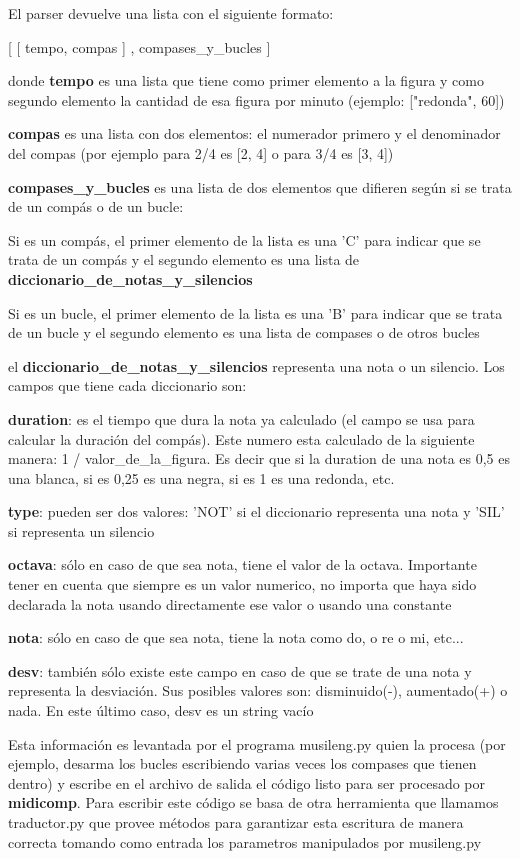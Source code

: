 El parser devuelve una lista con el siguiente formato:

[    [ tempo,  compas   ]   ,     compases\_y\_bucles  ]

donde \textbf{tempo} es una lista que tiene como primer elemento a la figura y como segundo elemento la cantidad de esa figura por minuto (ejemplo: ["redonda", 60])

\textbf{compas} es una lista con dos elementos: el numerador primero y el denominador del compas (por ejemplo para 2/4 es [2, 4] o para 3/4 es [3, 4])

\textbf{compases\_y\_bucles} es una lista de dos elementos que difieren según si se trata de un compás o de un bucle:

Si es un compás, el primer elemento de la lista es una 'C' para indicar que se trata de un compás y el segundo elemento es una lista de \textbf{diccionario\_de\_notas\_y\_silencios}

Si es un bucle, el primer elemento de la lista es una 'B' para indicar que se trata de un bucle y el segundo elemento es una lista de compases o de otros bucles

el \textbf{diccionario\_de\_notas\_y\_silencios} representa una nota o un silencio. Los campos que tiene cada diccionario son:

\textbf{duration}: es el tiempo que dura la nota ya calculado (el campo se usa para calcular la duración del compás). Este numero esta calculado de la siguiente manera: 1 / valor\_de\_la\_figura. Es decir que si la duration de una nota es 0,5 es una blanca, si es 0,25 es una negra, si es 1 es una redonda, etc.

\textbf{type}: pueden ser dos valores: 'NOT' si el diccionario representa una nota y 'SIL' si representa un silencio

\textbf{octava}: sólo en caso de que sea nota, tiene el valor de la octava. Importante tener en cuenta que siempre es un valor numerico, no importa que haya sido declarada la nota usando directamente ese valor o usando una constante

\textbf{nota}: sólo en caso de que sea nota, tiene la nota como do, o re o mi, etc...

\textbf{desv}: también sólo existe este campo en caso de que se trate de una nota y representa la desviación. Sus posibles valores son: disminuido(-), aumentado(+) o nada. En este último caso, desv es un string vacío

Esta información es levantada por el programa musileng.py quien la procesa (por ejemplo, desarma los bucles escribiendo varias veces los compases que tienen dentro) y escribe en el archivo de salida el código listo para ser procesado por \textbf{midicomp}. Para escribir este código se basa de otra herramienta que llamamos traductor.py que provee métodos para garantizar esta escritura de manera correcta tomando como entrada los parametros manipulados por musileng.py

